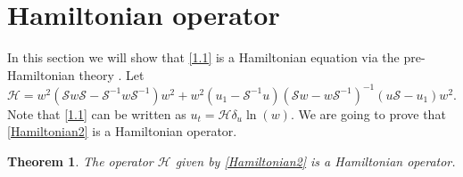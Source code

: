 \documentclass[fleqn,11pt,twoside]{article}
\newtheorem{theorem}{Theorem}[section]
\theoremstyle{definition}
\begin{document}
\section{Hamiltonian operator}\label{Sec2bis}
	In this section we will show that \eqref{1.1} is a Hamiltonian equation
	via the pre-Hamiltonian theory \cite{4,42}. Let
	\begin{equation}
		\mathcal{H} = w^2 \left(\mathcal{S} w \mathcal{S} - \mathcal{S}^{-1}w
\mathcal{S}^{-1} \right) w^2+ w^2\left(u_1-\mathcal{S}^{-1} u\right)
\left(\mathcal{S} w - w \mathcal{S}^{-1}\right)^{-1} (u \mathcal{S}-u_1) w^2 .
		\label{Hamiltonian2}
	\end{equation}
Note that \eqref{1.1} can be written as $u_t=\mathcal{H} \delta_u \ln(w) $.
We are going to prove that \eqref{Hamiltonian2} is a
Hamiltonian operator.
	\begin{theorem}\label{theo4}
		The operator $\mathcal{H}$ given by \eqref{Hamiltonian2} is
a Hamiltonian operator.
	\end{theorem}
\end{document}
